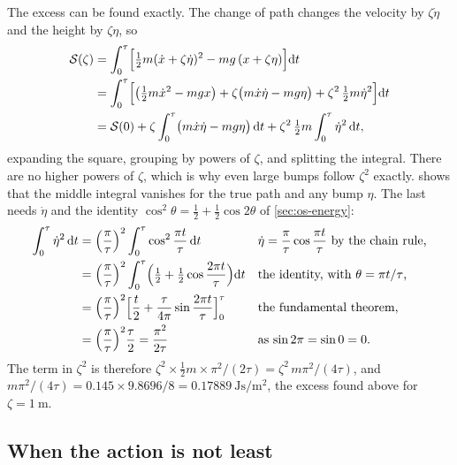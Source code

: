 The excess can be found exactly. The change of path changes the velocity
by $\zeta\dot\eta$ and the height by $\zeta\eta$, so
\begin{align*}
   \mathcal{S}(\zeta) &= \int_0^\tau\Bigl[\tfrac12 m(\dot{x} + \zeta
      \dot\eta)^2 - mg\,(x + \zeta\eta)\Bigr]\mathrm{d} t\\
   &= \int_0^\tau\Bigl[\bigl(\tfrac12 m\dot{x}^2 - mgx\bigr)
      + \zeta\bigl(m\dot{x}\dot\eta - mg\eta\bigr)
      + \zeta^2\,\tfrac12 m\dot\eta^2\Bigr]\mathrm{d} t\\
   &= \mathcal{S}(0) + \zeta\int_0^\tau\bigl(m\dot{x}\dot\eta - mg\eta\bigr)\,
      \mathrm{d} t + \zeta^2\,\tfrac12 m\int_0^\tau\dot\eta^2\,\mathrm{d} t ,
\end{align*}
expanding the square, grouping by powers of $\zeta$, and splitting the
integral.
There are no higher powers of $\zeta$, which is why even large bumps
follow $\zeta^2$ exactly.  shows that the middle
integral vanishes for the true path and any bump $\eta$. The last needs
$\dot\eta$ and the identity $\cos^2\theta = \frac12 + \frac12\cos2\theta$
of \cref{sec:os-energy}:
\begin{align*}
   \int_0^\tau\dot\eta^2\,\mathrm{d} t
   &= \Bigl(\frac{\pi}{\tau}\Bigr)^2\int_0^\tau\cos^2\frac{\pi t}{\tau}\,
      \mathrm{d} t
      && \text{$\dot\eta = \frac{\pi}{\tau}\cos\frac{\pi t}{\tau}$ by the
         chain rule,}\\
   &= \Bigl(\frac{\pi}{\tau}\Bigr)^2\int_0^\tau\Bigl(\tfrac12
      + \tfrac12\cos\frac{2\pi t}{\tau}\Bigr)\mathrm{d} t
      && \text{the identity, with $\theta = \pi t/\tau$,}\\
   &= \Bigl(\frac{\pi}{\tau}\Bigr)^2\Bigl[\frac{t}{2}
      + \frac{\tau}{4\pi}\sin\frac{2\pi t}{\tau}\Bigr]_0^\tau
      && \text{the fundamental theorem,}\\
   &= \Bigl(\frac{\pi}{\tau}\Bigr)^2\frac{\tau}{2} = \frac{\pi^2}{2\tau}
      && \text{as $\sin 2\pi = \sin 0 = 0$.}
\end{align*}
The term in $\zeta^2$ is therefore $\zeta^2\times\frac12 m\times\pi^2/(2
\tau) = \zeta^2\,m\pi^2/(4\tau)$, and $m\pi^2/(4\tau) = 0.145\times9.8696/8
= \SI{0.17889}{\joule\second\per\metre\squared}$, the excess found above
for $\zeta = \SI{1}{\metre}$.

\subsection*{When the action is not least}

